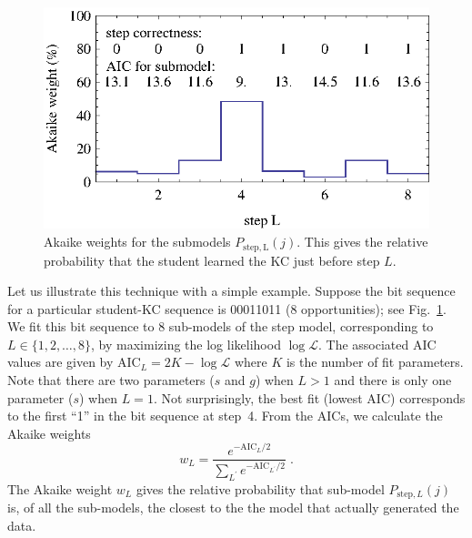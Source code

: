 \documentclass{acmlarge-edm}
\begin{document}
\begin{figure}
  \centering \includegraphics{step-weights.eps}
   \caption{Akaike weights for the submodels $P_\mathrm{step,L}(j)$.  
     This gives the relative probability that
      the student learned the KC just before step $L$.}
    \label{step-weights}
\end{figure}

Let us illustrate this technique with a simple example.  Suppose the
bit sequence for a particular student-KC sequence is 00011011 (8
opportunities); see Fig.~\ref{step-weights}.  We fit this bit sequence to 8
sub-models of the step model, corresponding to $L\in\{1,2,\ldots,8\}$,
by maximizing the log likelihood $\log\mathcal{L}$.  The associated
AIC values are given by $\mathrm{AIC}_L=2 K-\log \mathcal{L}$ where
$K$ is the number of fit parameters.  Note that there are two
parameters ($s$ and $g$) when $L>1$ and there is only one parameter
($s$) when $L=1$.
%
%
Not surprisingly, the best fit (lowest AIC) corresponds to the first
``1'' in the bit sequence at step~4.  From the AICs, we calculate 
the Akaike weights
%
\begin{equation}
     w_L=\frac{e^{-\mathrm{AIC}_L/2} }{\sum_{L^\prime}
       e^{-\mathrm{AIC}_{L^\prime}/2}} \; .
\end{equation}
%
The Akaike weight $w_L$ gives the relative probability that sub-model 
$P_{\mathrm{step},L}(j)$ is, of all the sub-models, the closest to the 
the model that actually generated the data.
\end{document}
